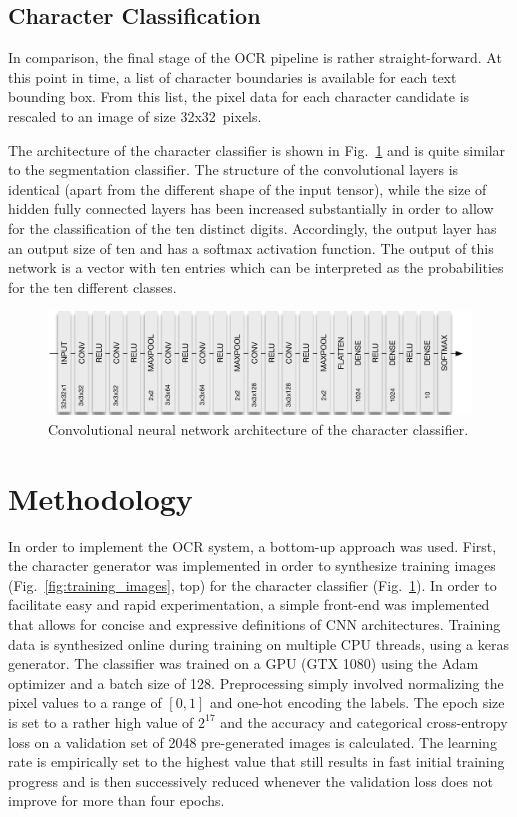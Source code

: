 \documentclass[12pt]{article}
\newcommand\figref[1]{Fig.~\ref{fig:#1}}
\begin{document}
\subsection{Character Classification}
In comparison, the final stage of the OCR pipeline is rather straight-forward. At this point
in time, a list of character boundaries is available for each text bounding box. From this list,
the pixel data for each character candidate is rescaled to an image of size 32x32~pixels.

The architecture of the character classifier is shown in \figref{classifier_cnn} and is
quite similar to the segmentation classifier. The structure of the convolutional layers is
identical (apart from the different shape of the input tensor), while the size of hidden
fully connected layers has been increased substantially in order to allow for the
classification of the ten distinct digits. Accordingly, the output layer has an output size
of ten and has a softmax activation function. The output of this network is a vector
with ten entries which can be interpreted as the probabilities for the ten different classes.

\begin{figure}[ht]
  \centering
  \includegraphics[scale=0.75]{fig/Classifier_CNN}
  \caption
  {
    Convolutional neural network architecture of the character classifier.
  }
  \label{fig:classifier_cnn}
\end{figure}


\section{Methodology}
In order to implement the OCR system, a bottom-up approach was used. First, the character generator
was implemented in order to synthesize training images (\figref{training_images}, top)
for the character classifier (\figref{classifier_cnn}). In order to facilitate easy and rapid
experimentation, a simple front-end was implemented that allows
for concise and expressive definitions of CNN architectures. Training data is synthesized online
during training on multiple CPU threads, using a keras generator. The classifier was trained
on a GPU (GTX 1080) using the Adam optimizer \cite{Kingma2014} and a batch size of 128.
Preprocessing simply involved normalizing the pixel values to a range of $[0, 1]$ and one-hot encoding
the labels. The epoch size is set to a rather high value of $2^{17}$ and the accuracy and categorical
cross-entropy loss on a validation set of 2048 pre-generated images is calculated. The learning rate is empirically
set to the highest value that still results in fast initial training progress and is then
successively reduced whenever the validation loss does not improve for more than four epochs.
\end{document}
